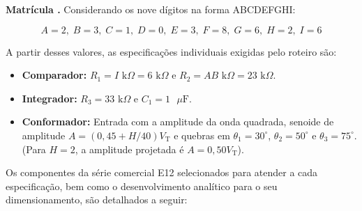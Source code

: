 \documentclass[11pt,a4paper]{article}
\begin{document}
\begin{espec}

\textbf{Matrícula .} Considerando os nove dígitos na forma ABCDEFGHI:

\begin{equation}
    A=2,\; B=3,\; C=1,\; D=0,\; E=3,\; F=8,\; G=6,\; H=2,\; I=6
\end{equation}

A partir desses valores, as especificações individuais exigidas pelo roteiro são:

\begin{itemize}
    \item \textbf{Comparador:} \hfill\break
    $R_1 = I\text{ k}\Omega = 6\text{ k}\Omega$ e $R_2 = AB\text{ k}\Omega = 23\text{ k}\Omega$.

\vspace{0.3cm}

    \item \textbf{Integrador:} \hfill\break
    $R_3 = 33\text{ k}\Omega$ e $C_1 = 1\text{ }\mu\text{F}$.
    
    \vspace{0.3cm}
    
    \item \textbf{Conformador:} \hfill\break
    Entrada com a amplitude da onda quadrada, senoide de amplitude $A = (0{,}45 + H/40) V_{\text{T}}$ e quebras em $\theta_{1} = 30^\circ$, $\theta_2 = 50^\circ$ e $\theta_3 = 75^\circ$. (Para $H=2$, a amplitude projetada é $A = 0{,}50 V_{\text{T}}$).
\end{itemize}

\end{espec}

Os componentes da série comercial E12 selecionados para atender a cada especificação, bem como o desenvolvimento analítico para o seu dimensionamento, são detalhados a seguir:
\end{document}
